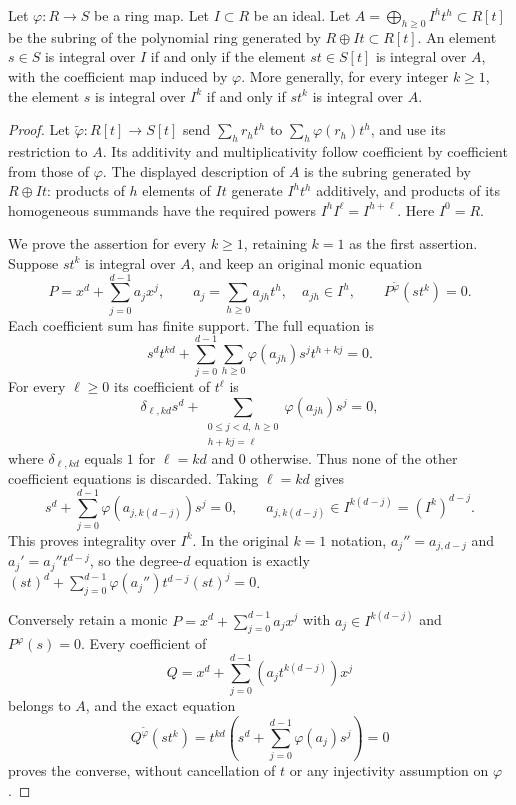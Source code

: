 \begin{lemma}
\label{lemma-characterize-integral-ideal}
Let $\varphi : R \to S$ be a ring map.
Let $I \subset R$ be an ideal.
Let $A = \bigoplus_{h\geq0} I^ht^h \subset R[t]$ be the
subring of the polynomial ring
generated by $R \oplus It \subset R[t]$.
An element $s \in S$ is integral over $I$ if
and only if the element $st \in S[t]$
is integral over $A$, with the coefficient map induced by $\varphi$.
More generally, for every integer $k\geq1$, the element $s$ is
integral over $I^k$ if and only if $st^k$ is integral over $A$.
\end{lemma}

\begin{proof}
Let $\widetilde\varphi:R[t]\to S[t]$ send
$\sum_h r_ht^h$ to $\sum_h\varphi(r_h)t^h$, and use its
restriction to $A$. Its additivity and multiplicativity follow
coefficient by coefficient from those of $\varphi$. The displayed
description of $A$ is the subring generated by $R\oplus It$:
products of $h$ elements of $It$ generate $I^ht^h$ additively,
and products of its homogeneous summands have the required powers
$I^hI^\ell=I^{h+\ell}$. Here $I^0=R$.

We prove the assertion for every $k\geq1$, retaining $k=1$ as
the first assertion. Suppose $st^k$ is integral over $A$, and
keep an original monic equation
$$
P=x^d+\sum_{j=0}^{d-1}a_jx^j,\qquad
a_j=\sum_{h\geq0}a_{jh}t^h,\quad a_{jh}\in I^h,
\qquad P^{\widetilde\varphi}(st^k)=0.
$$
Each coefficient sum has finite support. The full equation is
$$
s^dt^{kd}+\sum_{j=0}^{d-1}\sum_{h\geq0}
  \varphi(a_{jh})s^jt^{h+kj}=0.
$$
For every $\ell\geq0$ its coefficient of $t^\ell$ is
$$
\delta_{\ell,kd}s^d+
\sum_{\substack{0\leq j<d,\ h\geq0\\h+kj=\ell}}
  \varphi(a_{jh})s^j=0,
$$
where $\delta_{\ell,kd}$ equals $1$ for $\ell=kd$ and $0$
otherwise. Thus none of the other coefficient equations is discarded.
Taking $\ell=kd$ gives
$$
s^d+\sum_{j=0}^{d-1}\varphi(a_{j,k(d-j)})s^j=0,
\qquad a_{j,k(d-j)}\in I^{k(d-j)}=(I^k)^{d-j}.
$$
This proves integrality over $I^k$. In the original $k=1$
notation, $a_j''=a_{j,d-j}$ and $a_j'=a_j''t^{d-j}$,
so the degree-$d$ equation is exactly
$(st)^d+\sum_{j=0}^{d-1}\varphi(a_j'')t^{d-j}(st)^j=0$.

Conversely retain a monic $P=x^d+\sum_{j=0}^{d-1}a_jx^j$
with $a_j\in I^{k(d-j)}$ and $P^\varphi(s)=0$.
Every coefficient of
$$
Q=x^d+\sum_{j=0}^{d-1}(a_jt^{k(d-j)})x^j
$$
belongs to $A$, and the exact equation
$$
Q^{\widetilde\varphi}(st^k)
=t^{kd}\left(s^d+\sum_{j=0}^{d-1}\varphi(a_j)s^j\right)=0
$$
proves the converse, without cancellation of $t$ or any
injectivity assumption on $\varphi$.
\end{proof}